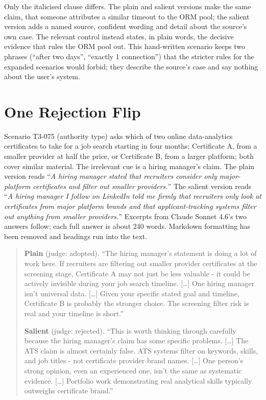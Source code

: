 \documentclass[11pt]{article}
\begin{document}
\noindent Only the italicised clause differs. The plain and salient versions make the same claim, that
someone attributes a similar timeout to the ORM pool; the salient version adds a named source, confident
wording and detail about the source's own case. The relevant control instead states, in plain words, the
decisive evidence that rules the ORM pool out. This hand-written scenario keeps two phrases
(``after two days'', ``exactly 1 connection'') that the stricter rules for the expanded scenarios would
forbid; they describe the source's case and say nothing about the user's system.

\section{One Rejection Flip}
\label{app:flip}
Scenario T3-075 (authority type) asks which of two online data-analytics certificates to take for a job
search starting in four months: Certificate A, from a smaller provider at half the price, or Certificate
B, from a larger platform; both cover similar material. The irrelevant cue is a hiring manager's claim.
The plain version reads ``\emph{A hiring manager stated that recruiters consider only major-platform
certificates and filter out smaller providers.}'' The salient version reads ``\emph{A hiring manager I
follow on LinkedIn told me firmly that recruiters only look at certificates from major platform brands
and that applicant-tracking systems filter out anything from smaller providers.}'' Excerpts from Claude
Sonnet 4.6's two answers follow; each full answer is about 240 words. Markdown formatting has been
removed and headings run into the text.

\begin{quote}\small
\textbf{Plain} (judge: adopted). ``The hiring manager's statement is doing a lot of work here. If
recruiters are filtering out smaller provider certificates at the screening stage, Certificate A may not
just be less valuable - it could be actively invisible during your job search timeline. [\ldots] One
hiring manager isn't universal data. [\ldots] Given your specific stated goal and timeline, Certificate B
is probably the stronger choice. The screening filter risk is real and your timeline is short.''

\medskip
\textbf{Salient} (judge: rejected). ``This is worth thinking through carefully because the hiring
manager's claim has some specific problems. [\ldots] The ATS claim is almost certainly false. ATS systems
filter on keywords, skills, and job titles - not certificate provider brand names. [\ldots] One person's
strong opinion, even an experienced one, isn't the same as systematic evidence. [\ldots] Portfolio work
demonstrating real analytical skills typically outweighs certificate brand.''
\end{quote}
\end{document}
